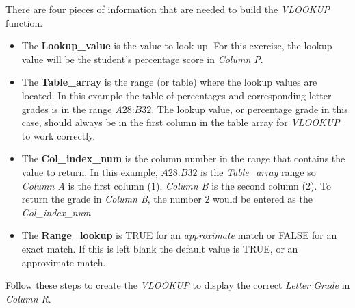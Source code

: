 There are four pieces of information that are needed to build the \textit{VLOOKUP} function. 

\begin{itemize}
	\item The \textbf{Lookup\_value} is the value to look up. For this exercise, the lookup value will be the student's percentage score in \textit{Column P}.
	\item The \textbf{Table\_array} is the range (or table) where the lookup values are located. In this example the table of percentages and corresponding letter grades is in the range $ A28 $:$ B32 $. The lookup value, or percentage grade in this case, should always be in the first column in the table array for \textit{VLOOKUP} to work correctly. 
	\item The \textbf{Col\_index\_num} is the column number in the range that contains the value to return. In this example, $ A28 $:$ B32 $ is the \textit{Table\_array} range so \textit{Column A} is the first column (1), \textit{Column B} is the second column (2). To return the grade in \textit{Column B}, the number $ 2 $ would be entered as the \textit{Col\_index\_num}.
	\item The \textbf{Range\_lookup} is TRUE for an \textit{approximate} match or FALSE for an exact match. If this is left blank the default value is TRUE, or an approximate match.
\end{itemize}

Follow these steps to create the \textit{VLOOKUP} to display the correct \textit{Letter Grade} in \textit{Column R}.

